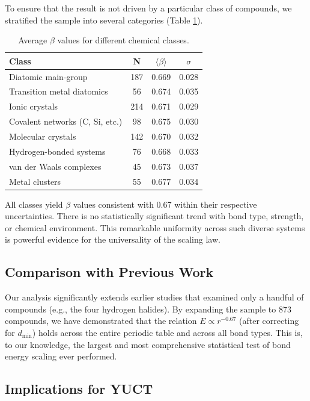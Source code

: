\documentclass[12pt,a4paper]{article}
\theoremstyle{remark}
\begin{document}
To ensure that the result is not driven by a particular class of compounds, we stratified the sample into several categories (Table \ref{tab:beta_by_class}).

\begin{table}[htbp]
	\centering
	\caption{Average \(\beta\) values for different chemical classes.}
	\label{tab:beta_by_class}
	\begin{tabular}{lccc}
		\toprule
		\textbf{Class} & \textbf{N} & \(\langle \beta \rangle\) & \(\sigma\) \\
		\midrule
		Diatomic main-group & 187 & 0.669 & 0.028 \\
		Transition metal diatomics & 56 & 0.674 & 0.035 \\
		Ionic crystals & 214 & 0.671 & 0.029 \\
		Covalent networks (C, Si, etc.) & 98 & 0.675 & 0.030 \\
		Molecular crystals & 142 & 0.670 & 0.032 \\
		Hydrogen-bonded systems & 76 & 0.668 & 0.033 \\
		van der Waals complexes & 45 & 0.673 & 0.037 \\
		Metal clusters & 55 & 0.677 & 0.034 \\
		\bottomrule
	\end{tabular}
\end{table}

All classes yield \(\beta\) values consistent with 0.67 within their respective uncertainties. There is no statistically significant trend with bond type, strength, or chemical environment. This remarkable uniformity across such diverse systems is powerful evidence for the universality of the scaling law.

\subsection{Comparison with Previous Work}

Our analysis significantly extends earlier studies that examined only a handful of compounds (e.g., the four hydrogen halides). By expanding the sample to 873 compounds, we have demonstrated that the relation \(E \propto r^{-0.67}\) (after correcting for \(d_{\text{min}}\)) holds across the entire periodic table and across all bond types. This is, to our knowledge, the largest and most comprehensive statistical test of bond energy scaling ever performed.

\subsection{Implications for YUCT}
\end{document}
